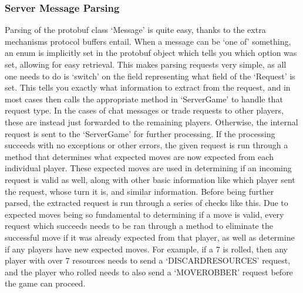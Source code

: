 \documentclass[a4paper,doc,draftfirst]{apa6}
\begin{document}
\subsubsection{Server Message Parsing}
Parsing of the protobuf class ‘Message’ is quite easy, thanks to the extra mechanisms protocol buffers entail. When a message can be ‘one of’ something, an enum is implicitly set in the protobuf object which tells you which option was set, allowing for easy retrieval. This makes parsing requests very simple, as all one needs to do is ‘switch’ on the field representing what field of the ‘Request’ is set. This tells you exactly what information to extract from the request, and in most cases then calls the appropriate method in ‘ServerGame’ to handle that request type. In the cases of chat messages or trade requests to other players, these are instead just forwarded to the remaining players. Otherwise, the internal request is sent to the ‘ServerGame’ for further processing. If the processing succeeds with no exceptions or other errors, the given request is run through a method that determines what expected moves are now expected from each individual player. These expected moves are used in determining if an incoming request is valid as well, along with other basic information like which player sent the request, whose turn it is, and similar information. Before being further parsed, the extracted request is run through a series of checks like this. Due to expected moves being so fundamental to determining if a move is valid, every request  which succeeds needs to be ran through a method to eliminate the successful move if it was already expected from that player, as well as determine if any players have new expected moves. For example, if a 7 is rolled, then any player with over 7 resources needs to send a ‘DISCARDRESOURCES’ request, and the player who rolled needs to also send a ‘MOVEROBBER’ request before the game can proceed.
\end{document}
